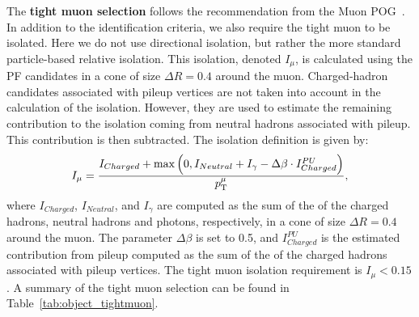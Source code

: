  
The \textbf{tight muon selection} follows the recommendation from the Muon POG~\cite{MuonID}.
In addition to the identification criteria, we also require the tight muon to be isolated. 
Here we do not use directional isolation, but rather the more standard particle-based relative
isolation. 
This isolation, denoted $I_\mu$, is calculated using the PF candidates in a cone of size $\Delta R =
0.4$ around the muon. Charged-hadron candidates associated with pileup vertices are not taken into
account in the calculation of the isolation. However, they are used to estimate the remaining
contribution to the isolation coming from neutral hadrons associated with pileup. This contribution
is then subtracted. 
The isolation definition is given by:
\begin{equation}
I_\mu = \frac{I_{Charged} + \max\left(0, I_{Neutral} + I_{\gamma} - \Delta\beta\cdot
I_{Charged}^{PU}\right)}
             {p_{\mathrm{T}}^\mu} , 
\label{eqn:iso}
\end{equation}
where $I_{Charged}$, $I_{Neutral}$, and $I_{\gamma}$ are computed as the sum of the \pt of the
charged hadrons, neutral hadrons and photons, respectively, in a cone of size $\Delta R = 0.4$
around the muon. The parameter $\Delta\beta$ is set to 0.5, and $I_{Charged}^{PU}$ is the estimated
contribution from pileup computed as the sum of the \pt of the charged hadrons associated with
pileup vertices.
The tight muon isolation requirement is $I_\mu < 0.15$.
A summary of the tight muon selection can be found in Table~\ref{tab:object_tightmuon}. 

